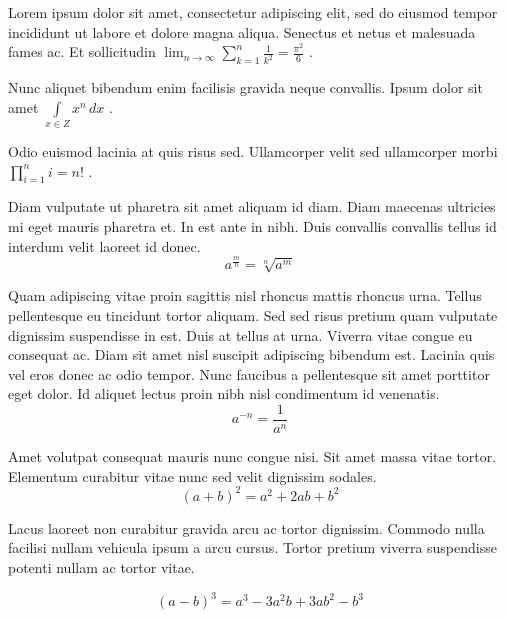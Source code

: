 \documentclass{article}
\begin{document}
Lorem ipsum dolor sit amet, consectetur adipiscing elit, sed do eiusmod tempor incididunt ut labore et dolore magna aliqua. Senectus et netus et malesuada fames ac. Et sollicitudin 
\begin{math}
	\lim_{n \to \infty}\sum_{k=1}^n \frac{1}{k^2}= \frac{\pi^2}{6}
\end{math}
.\newline
 
Nunc aliquet bibendum enim facilisis gravida neque convallis. Ipsum dolor sit amet
 $ \int\limits_{x\in Z}\! x^{n}\, dx $
 .\newline
    
Odio euismod lacinia at quis risus sed. Ullamcorper velit sed ullamcorper morbi 
\( \prod_{i=1}^ni=n! \)
.\newline

Diam vulputate ut pharetra sit amet aliquam id diam. Diam maecenas ultricies mi eget mauris pharetra et. In est ante in nibh. Duis convallis convallis tellus id interdum velit laoreet id donec. 
\[ a^{\frac{m}{n}}=\sqrt[n]{a^{m}} \]

Quam adipiscing vitae proin sagittis nisl rhoncus mattis rhoncus urna. Tellus pellentesque eu tincidunt tortor aliquam. Sed sed risus pretium quam vulputate dignissim suspendisse in est. Duis at tellus at urna. Viverra vitae congue eu consequat ac. Diam sit amet nisl suscipit adipiscing bibendum est. Lacinia quis vel eros donec ac odio tempor. Nunc faucibus a pellentesque sit amet porttitor eget dolor. Id aliquet lectus proin nibh nisl condimentum id venenatis.
$$ a^{-n}=\frac{1}{a^{n}} $$

Amet volutpat consequat mauris nunc congue nisi. Sit amet massa vitae tortor. Elementum curabitur vitae nunc sed velit dignissim sodales. 
\begin{displaymath}
	(a+b)^{2}=a^{2}+2ab+b^{2}
\end{displaymath}

Lacus laoreet non curabitur gravida arcu ac tortor dignissim. Commodo nulla facilisi nullam vehicula ipsum a arcu cursus. Tortor pretium viverra suspendisse potenti nullam ac tortor vitae. 

\begin{equation}
	(a-b)^{3}=a^{3}-3a^{2}b+3ab^{2}-b^{3}
\end{equation}
\end{document}
